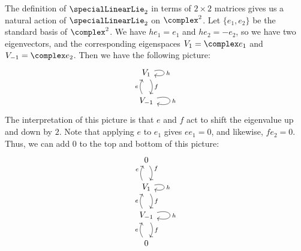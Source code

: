 \documentclass[fleqn]{NotesClass}
\begin{document}
    \begin{exm}{}{}
        The definition of \(\specialLinearLie_2\) in terms of \(2 \times 2\) matrices gives us a natural action of \(\specialLinearLie_2\) on \(\complex^2\).
        Let \(\{e_1, e_2\}\) be the standard basis of \(\complex^2\).
        We have \(he_1 = e_1\) and \(he_2 = -e_2\), so we have two eigenvectors, and the corresponding eigenspaces \(V_1 = \complex e_1\) and \(V_{-1} = \complex e_2\).
        Then we have the following picture:
        \begin{equation}
            \begin{tikzcd}
                V_1 \arrow[loop right, "h"] \arrow[d, bend left, "f"]\\
                V_{-1} \arrow[loop right, "h"] \arrow[u, bend left, "e"]
            \end{tikzcd}
        \end{equation}
        The interpretation of this picture is that \(e\) and \(f\) act to shift the eigenvalue up and down by \(2\).
        Note that applying \(e\) to \(e_1\) gives \(ee_1 = 0\), and likewise, \(fe_2 = 0\).
        Thus, we can add \(0\) to the top and bottom of this picture:
        \begin{equation}
            \begin{tikzcd}
                0 \arrow[d, bend left, "f"]\\
                V_1 \arrow[loop right, "h"] \arrow[d, bend left, "f"] \arrow[u, bend left, "e"]\\
                V_{-1} \arrow[loop right, "h"] \arrow[u, bend left, "e"] \arrow[d, bend left, "f"]\\
                0 \arrow[u, bend left, "e"]
            \end{tikzcd}
        \end{equation}
    \end{exm}
    
\end{document}
